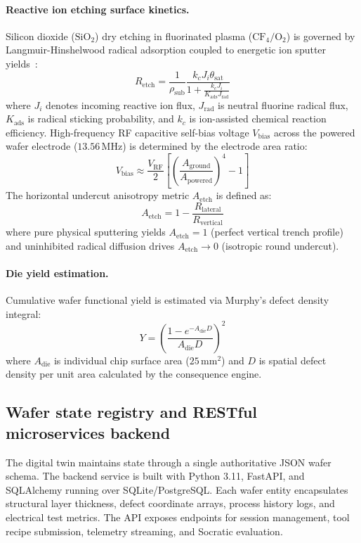 \documentclass[10pt,a4paper,twocolumn]{article}
\begin{document}
\paragraph{Reactive ion etching surface kinetics.}
Silicon dioxide ($\text{SiO}_2$) dry etching in fluorinated plasma ($\text{CF}_4/\text{O}_2$) is governed by Langmuir-Hinshelwood radical adsorption coupled to energetic ion sputter yields~\cite{lieberman2005principles}:
\begin{equation}
R_{\text{etch}} = \frac{1}{\rho_{\text{sub}}} \frac{k_c J_i \theta_{\text{sat}}}{1 + \frac{k_c J_i}{K_{\text{ads}} J_{\text{rad}}}}
\label{eq:rie_etch}
\end{equation}
where $J_i$ denotes incoming reactive ion flux, $J_{\text{rad}}$ is neutral fluorine radical flux, $K_{\text{ads}}$ is radical sticking probability, and $k_c$ is ion-assisted chemical reaction efficiency. High-frequency RF capacitive self-bias voltage $V_{\text{bias}}$ across the powered wafer electrode ($13.56\,\text{MHz}$) is determined by the electrode area ratio:
\begin{equation}
V_{\text{bias}} \approx \frac{V_{\text{RF}}}{2} \left[ \left( \frac{A_{\text{ground}}}{A_{\text{powered}}} \right)^4 - 1 \right]
\label{eq:sheath_bias}
\end{equation}
The horizontal undercut anisotropy metric $A_{\text{etch}}$ is defined as:
\begin{equation}
A_{\text{etch}} = 1 - \frac{R_{\text{lateral}}}{R_{\text{vertical}}}
\label{eq:anisotropy}
\end{equation}
where pure physical sputtering yields $A_{\text{etch}} = 1$ (perfect vertical trench profile) and uninhibited radical diffusion drives $A_{\text{etch}} \rightarrow 0$ (isotropic round undercut).

\paragraph{Die yield estimation.}
Cumulative wafer functional yield is estimated via Murphy's defect density integral:
\begin{equation}
Y = \left( \frac{1 - e^{-A_{\text{die}} D}}{A_{\text{die}} D} \right)^2
\label{eq:yield}
\end{equation}
where $A_{\text{die}}$ is individual chip surface area ($25\,\text{mm}^2$) and $D$ is spatial defect density per unit area calculated by the consequence engine.

\subsection*{Wafer state registry and RESTful microservices backend}
The digital twin maintains state through a single authoritative JSON wafer schema. The backend service is built with Python 3.11, FastAPI, and SQLAlchemy running over SQLite/PostgreSQL. Each wafer entity encapsulates structural layer thickness, defect coordinate arrays, process history logs, and electrical test metrics. The API exposes endpoints for session management, tool recipe submission, telemetry streaming, and Socratic evaluation.
\end{document}
